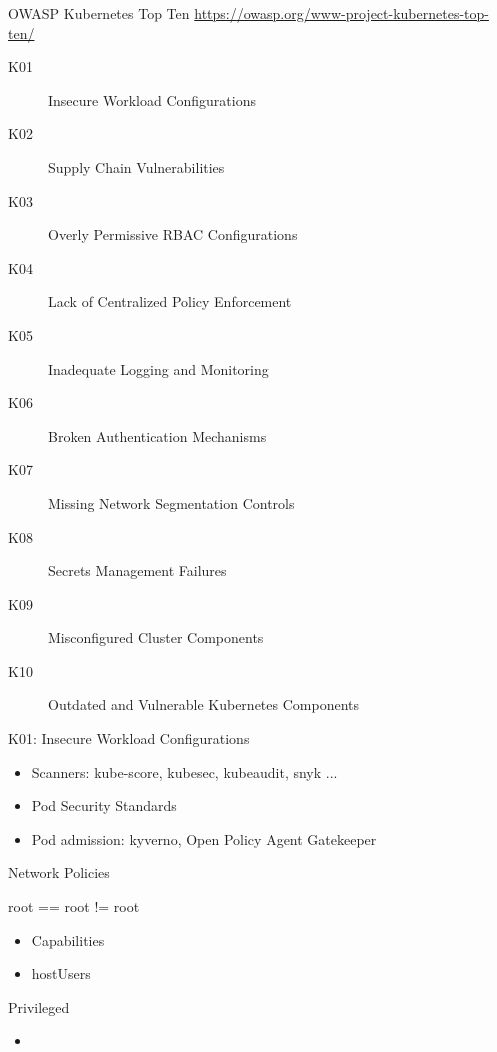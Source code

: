 \documentclass{dcpresentation}
\begin{document}

\begin{frame}{OWASP Kubernetes Top Ten}
  {\url{https://owasp.org/www-project-kubernetes-top-ten/}}
 \begin{description}
  \item[K01] Insecure Workload Configurations
  \item[K02] Supply Chain Vulnerabilities
  \item[K03] Overly Permissive RBAC Configurations
  \item[K04] Lack of Centralized Policy Enforcement
  \item[K05] Inadequate Logging and Monitoring
  \item[K06] Broken Authentication Mechanisms
  \item[K07] Missing Network Segmentation Controls
  \item[K08] Secrets Management Failures
  \item[K09] Misconfigured Cluster Components
  \item[K10] Outdated and Vulnerable Kubernetes Components
 \end{description}
\end{frame}

\begin{frame}{K01: Insecure Workload Configurations}
 \begin{itemize}
  \item Scanners: kube-score, kubesec, kubeaudit, snyk ...
  \item Pod Security Standards
  \item Pod admission: kyverno, Open Policy Agent Gatekeeper
 \end{itemize}
\end{frame}

\begin{frame}
 Network Policies 
\end{frame}

\begin{frame}{root == root != root}
 \begin{itemize}
  \item Capabilities
  \item hostUsers
 \end{itemize}
\end{frame}

\begin{frame}{Privileged}
 \begin{itemize}
  \item 
 \end{itemize}
\end{frame}
\end{document}
